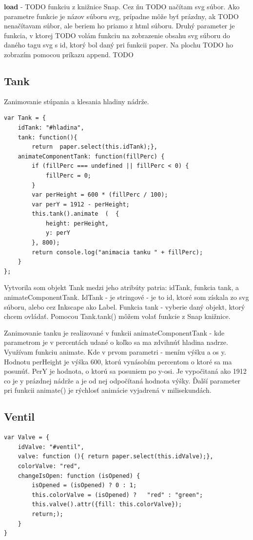 \textbf{load} - TODO funkciu z knižnice Snap. Cez ňu TODO načítam  svg súbor. Ako parametre funkcie je názov súboru svg, prípadne môže byť prázdny, ak TODO nenačítavam súbor, ale beriem ho priamo z html súboru. Druhý parameter je funkcia, v ktorej TODO volám funkciu na zobrazenie obsahu svg súboru do daného tagu svg s  id, ktorý bol daný pri funkcii paper.  Na plochu TODO ho zobrazím pomocou príkazu append. TODO

\subsection{Tank}
Zanimovanie stúpania a klesania hladiny nádrže. 
\begin{lstlisting}
var Tank = {
	idTank: "#hladina",
	tank: function(){
		return  paper.select(this.idTank);},
	animateComponentTank: function(fillPerc) {
		if (fillPerc === undefined || fillPerc < 0) {
			fillPerc = 0;
		}
		var perHeight = 600 * (fillPerc / 100);
		var perY = 1912 - perHeight;
		this.tank().animate  (	{
			height: perHeight,
			y: perY
		}, 800);
		return console.log("animacia tanku " + fillPerc);
	}
};
\end{lstlisting}
Vytvorila som objekt Tank medzi jeho atribúty patria: idTank, funkcia tank, a animateComponentTank. IdTank - je stringové - je to id, ktoré som získala zo svg súboru, alebo cez Inkscape ako Label. Funkcia tank - vyberie daný objekt, ktorý chcem ovládať. Pomocou Tank.tank() môžem volať funkcie z Snap knižnice. 

Zanimovanie tanku je realizované v funkcii animateComponentTank - kde parametrom je v percentách udané o koľko sa ma zdvihnúť hladina nadrze. 
Využívam funkciu animate. Kde v prvom parametri - mením výšku a os y. Hodnotu perHeight je výška 600, ktorú vynásobím percentom o ktoré sa ma posunúť. PerY je hodnota, o ktorú sa posuniem po y-osi. Je vypočitaná ako 1912 co je y prázdnej nádrže a je od nej odpočítaná hodnota výšky. 
Ďalší parameter pri funkcii animate() je rýchlosť animácie vyjadrená v milisekundách.

\subsection{Ventil}

\begin{lstlisting}
var Valve = {
	idValve: "#ventil",
	valve: function (){ return paper.select(this.idValve);},
	colorValve: "red",
	changeIsOpen: function (isOpened) {
		isOpened = (isOpened) ? 0 : 1;
		this.colorValve = (isOpened) ?   "red" : "green";
		this.valve().attr({fill: this.colorValve});
		return;);
	}
}
\end{lstlisting}

